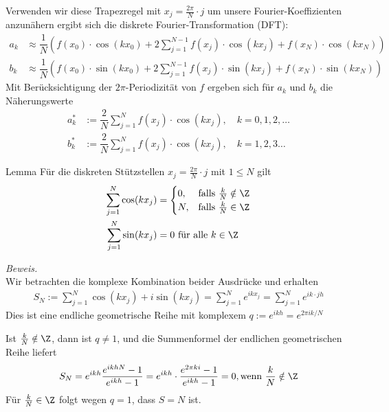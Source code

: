 Verwenden wir diese Trapezregel mit $x_j=\tfrac{2\pi}{N}\cdot j$ um unsere Fourier-Koeffizienten anzunähern 
ergibt sich die diskrete Fourier-Transformation (DFT):
%
\begin{align*}
  a_k &\approx\dfrac{1}{N}\left(f(x_0)\cdot\cos(kx_0) 
  + 2\sum_{j=1}^{N-1} f(x_j)\cdot\cos(kx_j) + f(x_N)\cdot \cos(kx_N)\right) \\
  b_k &\approx\dfrac{1}{N}\left(f(x_0)\cdot\sin(kx_0)  
  + 2\sum_{j=1}^{N-1} f(x_j)\cdot\sin(kx_j) + f(x_N)\cdot \sin(kx_N)\right)
\end{align*}
%
Mit Berücksichtigung der $2\pi$-Periodizität von $f$ ergeben sich für $a_k$ und $b_k$ die Näherungswerte
%
\begin{align*}
  a_k^* &:= \dfrac{2}{N}\sum_{j=1}^N f(x_j)\cdot \cos(kx_j), \quad k=0,1,2,\dots \\
  b_k^* &:= \dfrac{2}{N}\sum_{j=1}^N f(x_j)\cdot \cos(kx_j), \quad k=1,2,3\dots
\end{align*}

\begin{colbox}{Lemma}\label{lem:diskStstelSum}
  Für die diskreten Stützstellen $x_j=\tfrac{2\pi}{N}\cdot j$ mit $1\leq N$  gilt
  \begin{align*}
    \sum_{j=1}^N \cos(kx_j) 
    &= \begin{cases}
      0, & \text{falls } \tfrac{k}{N}\notin\Z \\
      N, & \text{falls } \tfrac{k}{N}\in\Z
    \end{cases} \\
    \sum_{j=1}^N \sin(kx_j) 
    &= 0 \text{ für alle } k\in\Z
  \end{align*}
\end{colbox}

\textit{Beweis.}\\
Wir betrachten die komplexe Kombination beider Ausdrücke und erhalten
%
\begin{align*}
  S_N := \sum_{j=1}^{N} \cos(kx_j) + i\sin(kx_j) = \sum_{j=1}^{N} e^{ikx_j} = \sum_{j=1}^{N} e^{ik\cdot jh}
\end{align*}%
Dies ist eine endliche geometrische Reihe mit komplexem $q := e^{ikh} = e^{2\pi ik/N}$

Ist $\tfrac{k}{N}\notin\Z$, dann ist $q\neq 1$, und die Summenformel der endlichen geometrischen Reihe liefert 
%
\begin{align*}
   S_N 
   = e^{ikh}\dfrac{e^{ikhN}-1}{e^{ikh}-1} 
   = e^{ikh}\cdot\dfrac{e^{2\pi ki}-1}{e^{ikh}-1} 
   = 0, \text{wenn } \dfrac{k}{N}\notin\Z
\end{align*}
%
Für $\tfrac{k}{N}\in\Z$ folgt wegen $q=1$, dass $S=N$ ist. 


